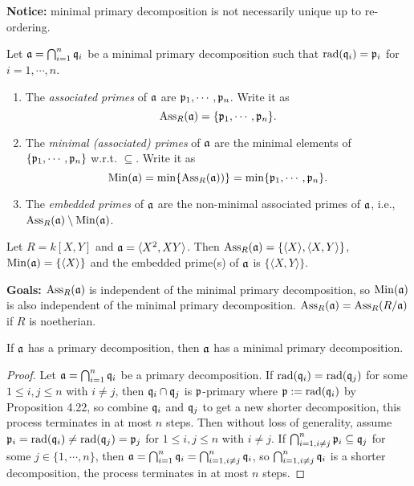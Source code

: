 \noindent \textbf{Notice:} minimal primary decomposition is not necessarily unique up to re-ordering.

\begin{definition}
    Let $\mathfrak{a} = \bigcap_{i=1}^{n} \mathfrak{q}_i$ be a minimal primary decomposition such that $\operatorname{rad}(\mathfrak{q}_i) = \mathfrak{p}_i$ for $i = 1,\cdots,n$.
    \begin{enumerate}
        \item The \emph{associated primes} of $\mathfrak{a}$ are $\mathfrak{p}_1,\cdots,\mathfrak{p}_n$. Write it as 
            \[\operatorname{Ass}_R(\mathfrak{a}) = \{\mathfrak{p}_1,\cdots,\mathfrak{p}_n\}.\]
        \item The \emph{minimal (associated) primes} of $\mathfrak{a}$ are the minimal elements of $\{\mathfrak{p}_1,\cdots,\mathfrak{p}_n\}$ w.r.t. $\subseteq$. Write it as 
            \[\operatorname{Min}(\mathfrak{a}) = \min\{\operatorname{Ass}_R(\mathfrak{a}))\} = \min\{\mathfrak{p}_1,\cdots,\mathfrak{p}_n\}.\]
    \item The \emph{embedded primes} of $\mathfrak{a}$ are the non-minimal associated primes of $\mathfrak{a}$, i.e., $\operatorname{Ass}_R(\mathfrak{a}) \setminus \operatorname{Min}(\mathfrak{a})$.
    \end{enumerate}
\end{definition}

\begin{example}
    Let $R = k[X,Y]$ and $\mathfrak{a} = \langle X^{2},XY \rangle$. Then $\operatorname{Ass}_R(\mathfrak{a}) = \{\langle X \rangle, \langle X,Y \rangle\}$, $\operatorname{Min}(\mathfrak{a}) = \{\langle X \rangle\}$ and the embedded prime(s) of $\mathfrak{a}$ is $\{\langle X,Y \rangle\}$.
\end{example}

\noindent \textbf{Goals:} $\operatorname{Ass}_R(\mathfrak{a})$ is independent of the minimal primary decomposition, so $\operatorname{Min}(\mathfrak{a})$ is also independent of the minimal primary decomposition. $\operatorname{Ass}_R(\mathfrak{a}) = \operatorname{Ass}_R(R/\mathfrak{a})$ if $R$ is noetherian.

\begin{proposition}
    If $\mathfrak{a}$ has a primary decomposition, then $\mathfrak{a}$ has a minimal primary decomposition.
\end{proposition}

\begin{proof}
    Let $\mathfrak{a} = \bigcap_{i=1}^{n} \mathfrak{q}_i$ be a primary decomposition. If $\operatorname{rad}(\mathfrak{q}_i) = \operatorname{rad}(\mathfrak{q}_j)$ for some $1 \leq i,j \leq n$ with $i \neq j$, then $\mathfrak{q}_i \cap \mathfrak{q}_j$ is $\mathfrak{p}$-primary where $\mathfrak{p} := \operatorname{rad}(\mathfrak{q}_i)$ by Proposition 4.22, so combine $\mathfrak{q}_i$ and $\mathfrak{q}_j$ to get a new shorter decomposition, this process terminates in at most $n$ steps. Then without loss of generality, assume $\mathfrak{p}_i = \operatorname{rad}(\mathfrak{q}_i) \neq \operatorname{rad}(\mathfrak{q}_j) = \mathfrak{p}_j$ for $1 \leq i,j \leq n$ with $i \neq j$. If $\bigcap_{i=1,i\neq j}^{n} \mathfrak{p}_i \subseteq \mathfrak{q}_j$ for some $j \in \{1,\cdots,n\}$, then $\mathfrak{a} = \bigcap_{i=1}^{n} \mathfrak{q}_i = \bigcap_{i=1,i \neq j}^{n} \mathfrak{q}_i$, so $\bigcap_{i=1,i \neq j}^{n} \mathfrak{q}_i$ is a shorter decomposition, the process terminates in at most $n$ steps.
\end{proof}

